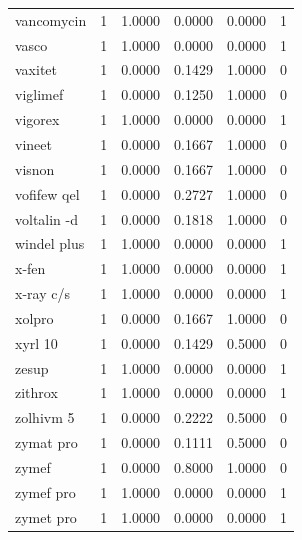 \begin{longtable}{p{3.0cm}rrrrr}
vancomycin & 1 & 1.0000 & 0.0000 & 0.0000 & 1 \\
vasco & 1 & 1.0000 & 0.0000 & 0.0000 & 1 \\
vaxitet & 1 & 0.0000 & 0.1429 & 1.0000 & 0 \\
viglimef & 1 & 0.0000 & 0.1250 & 1.0000 & 0 \\
vigorex & 1 & 1.0000 & 0.0000 & 0.0000 & 1 \\
vineet & 1 & 0.0000 & 0.1667 & 1.0000 & 0 \\
visnon & 1 & 0.0000 & 0.1667 & 1.0000 & 0 \\
vofifew qel & 1 & 0.0000 & 0.2727 & 1.0000 & 0 \\
voltalin -d & 1 & 0.0000 & 0.1818 & 1.0000 & 0 \\
windel plus & 1 & 1.0000 & 0.0000 & 0.0000 & 1 \\
x-fen & 1 & 1.0000 & 0.0000 & 0.0000 & 1 \\
x-ray c/s & 1 & 1.0000 & 0.0000 & 0.0000 & 1 \\
xolpro & 1 & 0.0000 & 0.1667 & 1.0000 & 0 \\
xyrl 10 & 1 & 0.0000 & 0.1429 & 0.5000 & 0 \\
zesup & 1 & 1.0000 & 0.0000 & 0.0000 & 1 \\
zithrox & 1 & 1.0000 & 0.0000 & 0.0000 & 1 \\
zolhivm 5 & 1 & 0.0000 & 0.2222 & 0.5000 & 0 \\
zymat pro & 1 & 0.0000 & 0.1111 & 0.5000 & 0 \\
zymef & 1 & 0.0000 & 0.8000 & 1.0000 & 0 \\
zymef pro & 1 & 1.0000 & 0.0000 & 0.0000 & 1 \\
zymet pro & 1 & 1.0000 & 0.0000 & 0.0000 & 1 \\
\end{longtable}
\endgroup
